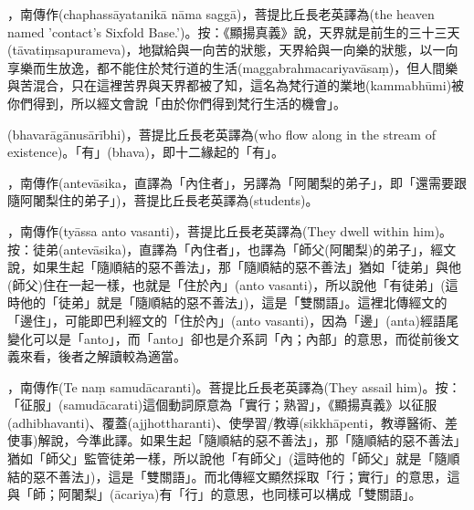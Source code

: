 \startitemgroup[noteitems]
\item{}，南傳作(chaphassāyatanikā nāma saggā)，菩提比丘長老英譯為(the heaven named  'contact's Sixfold Base.')。按：《顯揚真義》說，天界就是前生的三十三天(tāvatiṃsapurameva)，地獄給與一向苦的狀態，天界給與一向樂的狀態，以一向享樂而生放逸，都不能住於梵行道的生活(maggabrahmacariyavāsaṃ)，但人間樂與苦混合，只在這裡苦界與天界都被了知，這名為梵行道的業地(kammabhūmi)被你們得到，所以經文會說「由於你們得到梵行生活的機會」。
\stopitemgroup

\startitemgroup[noteitems]
\item{}(bhavarāgānusārībhi)，菩提比丘長老英譯為(who flow along in the stream of existence)。「有」(bhava)，即十二緣起的「有」。
\stopitemgroup

\startitemgroup[noteitems]
\item{}，南傳作(antevāsika，直譯為「內住者」，另譯為「阿闍梨的弟子」，即「還需要跟隨阿闍梨住的弟子」)，菩提比丘長老英譯為(students)。
\stopitemgroup

\startitemgroup[noteitems]
\item{}，南傳作(tyāssa anto vasanti)，菩提比丘長老英譯為(They dwell within him)。按：徒弟(antevāsika)，直譯為「內住者」，也譯為「師父(阿闍梨)的弟子」，經文說，如果生起「隨順結的惡不善法」，那「隨順結的惡不善法」猶如「徒弟」與他(師父)住在一起一樣，也就是「住於內」(anto vasanti)，所以說他「有徒弟」(這時他的「徒弟」就是「隨順結的惡不善法」)，這是「雙關語」。這裡北傳經文的「邊住」，可能即巴利經文的「住於內」(anto vasanti)，因為「邊」(anta)經語尾變化可以是「anto」，而「anto」卻也是介系詞「內；內部」的意思，而從前後文義來看，後者之解讀較為適當。
\stopitemgroup

\startitemgroup[noteitems]
\item{}，南傳作(Te naṃ samudācaranti)。菩提比丘長老英譯為(They assail him)。按：「征服」(samudācarati)這個動詞原意為「實行；熟習」，《顯揚真義》以征服(adhibhavanti)、覆蓋(ajjhottharanti)、使學習/教導(sikkhāpenti，教導醫術、差使事)解說，今準此譯。如果生起「隨順結的惡不善法」，那「隨順結的惡不善法」猶如「師父」監管徒弟一樣，所以說他「有師父」(這時他的「師父」就是「隨順結的惡不善法」)，這是「雙關語」。而北傳經文顯然採取「行；實行」的意思，這與「師；阿闍梨」(ācariya)有「行」的意思，也同樣可以構成「雙關語」。
\stopitemgroup

